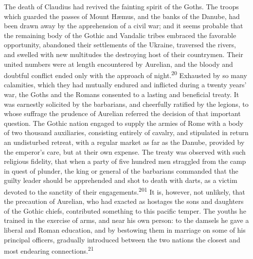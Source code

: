 The death of Claudius had revived the fainting spirit of the
Goths. The troops which guarded the passes of Mount Hæmus, and
the banks of the Danube, had been drawn away by the apprehension
of a civil war; and it seems probable that the remaining body of
the Gothic and Vandalic tribes embraced the favorable
opportunity, abandoned their settlements of the Ukraine,
traversed the rivers, and swelled with new multitudes the
destroying host of their countrymen. Their united numbers were at
length encountered by Aurelian, and the bloody and doubtful
conflict ended only with the approach of night.\textsuperscript{20} Exhausted by
so many calamities, which they had mutually endured and inflicted
during a twenty years’ war, the Goths and the Romans consented to
a lasting and beneficial treaty. It was earnestly solicited by
the barbarians, and cheerfully ratified by the legions, to whose
suffrage the prudence of Aurelian referred the decision of that
important question. The Gothic nation engaged to supply the
armies of Rome with a body of two thousand auxiliaries,
consisting entirely of cavalry, and stipulated in return an
undisturbed retreat, with a regular market as far as the Danube,
provided by the emperor’s care, but at their own expense. The
treaty was observed with such religious fidelity, that when a
party of five hundred men straggled from the camp in quest of
plunder, the king or general of the barbarians commanded that the
guilty leader should be apprehended and shot to death with darts,
as a victim devoted to the sanctity of their engagements.\textsuperscript{201} It
is, however, not unlikely, that the precaution of Aurelian, who
had exacted as hostages the sons and daughters of the Gothic
chiefs, contributed something to this pacific temper. The youths
he trained in the exercise of arms, and near his own person: to
the damsels he gave a liberal and Roman education, and by
bestowing them in marriage on some of his principal officers,
gradually introduced between the two nations the closest and most
endearing connections.\textsuperscript{21}




